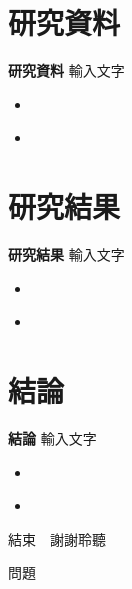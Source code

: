 \documentclass[12pt,aspectratio=43]{beamer}
\begin{document}
\section{研究資料}

\begin{frame}{\textbf{研究資料}}
\linespread{1.5}
  {輸入文字}
  \begin{itemize}
    \item
  \end{itemize}
  \begin{itemize}
    \item 
  \end{itemize}
\end{frame}

\section{研究結果}

\begin{frame}{\textbf{研究結果}}
\linespread{1.5}
  {輸入文字}
  \begin{itemize}
    \item
  \end{itemize}
  \begin{itemize}
    \item 
  \end{itemize}
\end{frame}

\section{結論}

\begin{frame}{\textbf{結論}}
\linespread{1.5}
  {輸入文字}
  \begin{itemize}
    \item
  \end{itemize}
  \begin{itemize}
    \item 
  \end{itemize}
\end{frame}

\begin{frame}[plain] %
	\begin{center}
		{\Huge 結束　謝謝聆聽}
		\bigskip\bigskip 
		
		{\LARGE 問題}
	\end{center}
\end{frame}
\end{document}
